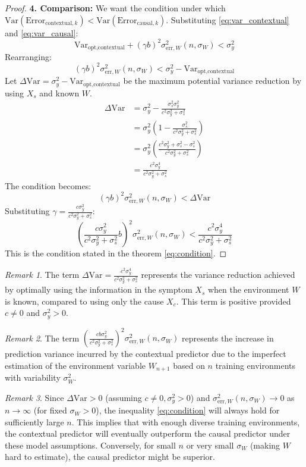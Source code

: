 \documentclass{article}
\theoremstyle{plain}
\theoremstyle{definition}
\theoremstyle{remark}
\newtheorem{remark}{Remark}[section]
\newcommand{\Var}{\text{Var}}
\begin{document}
\begin{proof}
\textbf{4. Comparison:}
We want the condition under which $\Var(\text{Error}_{\text{contextual}, k}) < \Var(\text{Error}_{\text{causal}, k})$.
Substituting \eqref{eq:var_contextual} and \eqref{eq:var_causal}:
\[
\Var_{\text{opt}, \text{contextual}} + (\gamma b)^2 \sigma_{\text{err},W}^2(n, \sigma_W) < \sigma_y^2
\]
Rearranging:
\[
(\gamma b)^2 \sigma_{\text{err},W}^2(n, \sigma_W) < \sigma_y^2 - \Var_{\text{opt}, \text{contextual}}
\]
Let $\Delta\Var = \sigma_y^2 - \Var_{\text{opt}, \text{contextual}}$ be the maximum potential variance reduction by using $X_s$ and known $W$.
\begin{align*}
\Delta\Var &= \sigma_y^2 - \frac{\sigma_s^2 \sigma_y^2}{c^2\sigma_y^2 + \sigma_s^2} \\
&= \sigma_y^2 \left( 1 - \frac{\sigma_s^2}{c^2\sigma_y^2 + \sigma_s^2} \right) \\
&= \sigma_y^2 \left( \frac{c^2\sigma_y^2 + \sigma_s^2 - \sigma_s^2}{c^2\sigma_y^2 + \sigma_s^2} \right) \\
&= \frac{c^2 \sigma_y^4}{c^2\sigma_y^2 + \sigma_s^2}
\end{align*}
The condition becomes:
\[
(\gamma b)^2 \sigma_{\text{err},W}^2(n, \sigma_W) < \Delta\Var
\]
Substituting $\gamma = \frac{c\sigma_y^2}{c^2\sigma_y^2 + \sigma_s^2}$:
\[
\left( \frac{c\sigma_y^2}{c^2\sigma_y^2 + \sigma_s^2} b \right)^2 \sigma_{\text{err},W}^2(n, \sigma_W) < \frac{c^2 \sigma_y^4}{c^2\sigma_y^2 + \sigma_s^2}
\]
This is the condition stated in the theorem \eqref{eq:condition}.
\end{proof}

\begin{remark}
The term $\Delta\Var = \frac{c^2 \sigma_y^4}{c^2\sigma_y^2 + \sigma_s^2}$ represents the variance reduction achieved by optimally using the information in the symptom $X_s$ when the environment $W$ is known, compared to using only the cause $X_c$. This term is positive provided $c \neq 0$ and $\sigma_y^2 > 0$.
\end{remark}

\begin{remark}
The term $\left( \frac{c b \sigma_y^2}{c^2\sigma_y^2 + \sigma_s^2} \right)^2 \sigma_{\text{err},W}^2(n, \sigma_W)$ represents the increase in prediction variance incurred by the contextual predictor due to the imperfect estimation of the environment variable $W_{n+1}$ based on $n$ training environments with variability $\sigma_W^2$.
\end{remark}

\begin{remark}
Since $\Delta\Var > 0$ (assuming $c \neq 0, \sigma_y^2 > 0$) and $\sigma_{\text{err},W}^2(n, \sigma_W) \to 0$ as $n \to \infty$ (for fixed $\sigma_W > 0$), the inequality \eqref{eq:condition} will always hold for sufficiently large $n$. This implies that with enough diverse training environments, the contextual predictor will eventually outperform the causal predictor under these model assumptions. Conversely, for small $n$ or very small $\sigma_W$ (making $W$ hard to estimate), the causal predictor might be superior.
\end{remark}
\end{document}

